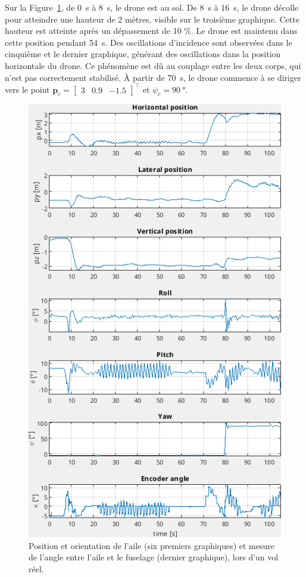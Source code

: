 Sur la Figure~\ref{fig:colibri_flight}, de \SI{0}{\second} à \SI{8}{\second}, le drone est au sol. De \SI{8}{\second} à \SI{16}{\second}, le drone décolle pour atteindre une hauteur de 2 mètres, visible sur le troisième graphique. Cette hauteur est atteinte après un dépassement de 10 \%. Le drone est maintenu dans cette position pendant \SI{54}{\second}. Des oscillations d'incidence sont observées dans le cinquième et le dernier graphique, générant des oscillations dans la position horizontale du drone. Ce phénomène est dû au couplage entre les deux corps, qui n'est pas correctement stabilisé. À partir de \SI{70}{\second}, le drone commence à se diriger vers le point $\boldsymbol{p}_{c} = \begin{bmatrix} 3 & 0.9 & -1.5 \end{bmatrix}^\top$ et $\psi_{c}=\SI{90}{\degree}$.
\begin{figure}[ht!]
\centering
    \includegraphics[width=0.6\columnwidth,angle=0]{figures/colibri_flight.png}
    \caption{Position et orientation de l'aile (six premiers graphiques) et mesure de l'angle entre l'aile et le fuselage (dernier graphique), lors d'un vol réel. }
    \label{fig:colibri_flight}
\end{figure}
